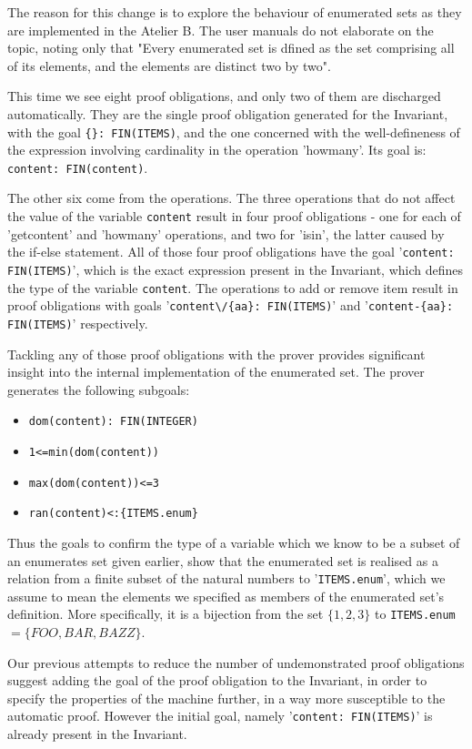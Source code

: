 \documentclass[11pt,journal]{IEEEtran}
\begin{document}
	The reason for this change is to explore the behaviour of enumerated sets as they are implemented in the Atelier B. The user manuals do not elaborate on the topic, noting only that "Every enumerated set is dfined as the set comprising all of its elements, and the
	elements are distinct two by two"\cite{PO reference}.
	
	This time we see eight proof obligations, and only two of them are discharged automatically. They are the single proof obligation generated for the Invariant, with the goal \texttt{\{\}: FIN(ITEMS)}, and the one concerned with the well-defineness of the expression involving cardinality in the operation 'howmany'. Its goal is: \texttt{content: FIN(content)}.
	
	The other six come from the operations. The three operations that do not affect the value of the variable \texttt{content} result in four proof obligations - one for each of 'getcontent' and 'howmany' operations, and two for 'isin', the latter caused by the if-else statement. All of those four proof obligations have the goal '\texttt{content: FIN(ITEMS)}', which is the exact expression present in the Invariant, which defines the type of the variable \texttt{content}. The operations to add or remove item result in proof obligations with goals '\verb|content\/{aa}: FIN(ITEMS)|' and '\verb|content-{aa}: FIN(ITEMS)|' respectively. 
	
	Tackling any of those proof obligations with the prover provides significant insight into the internal implementation of the enumerated set. The prover generates the following subgoals:
	
	\begin{itemize}
		\item \verb|dom(content): FIN(INTEGER)|
		\item \verb|1<=min(dom(content))|
		\item \verb|max(dom(content))<=3|
		\item \verb|ran(content)<:{ITEMS.enum}|
	\end{itemize}
	Thus the goals to confirm the type of a variable which we know to be a subset of an enumerates set given earlier, show that the enumerated set is realised as a relation from a finite subset of the natural numbers to '\texttt{ITEMS.enum}', which we assume to mean the elements we specified as members of the enumerated set's definition. More specifically, it is a bijection from the set $\{1,2,3\}$ to \texttt{ITEMS.enum} $= \{FOO, BAR, BAZZ\}$.
	
	Our previous attempts to reduce the number of undemonstrated proof obligations suggest adding the goal of the proof obligation to the Invariant, in order to specify the properties of the machine further, in a way more susceptible to the automatic proof. However the initial goal, namely '\texttt{content: FIN(ITEMS)}' is already present in the Invariant. 
	
\end{document}
